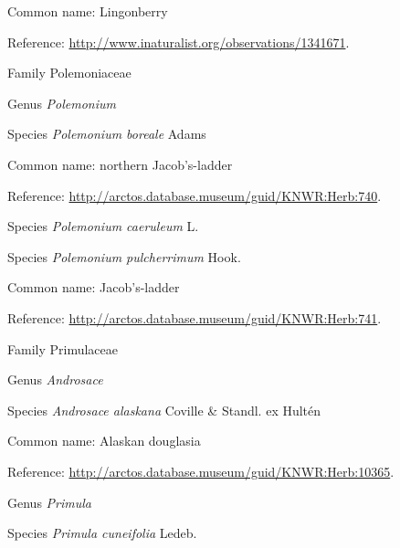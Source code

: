\documentclass[9pt, article]{memoir}
\begin{document}
\begin{multicols}{2}
Common name: Lingonberry

Reference: 
\url{http://www.inaturalist.org/observations/1341671}.

\vspace{6pt}\noindent\hspace{24pt}Family Polemoniaceae


\vspace{6pt}\noindent\hspace{30pt}Genus \textit{Polemonium}


\vspace{6pt}\noindent\hspace{36pt}Species \textit{Polemonium boreale} Adams


Common name: northern Jacob's-ladder

Reference: 
\url{http://arctos.database.museum/guid/KNWR:Herb:740}.

\vspace{6pt}\noindent\hspace{36pt}Species \textit{Polemonium caeruleum} L.


\vspace{6pt}\noindent\hspace{36pt}Species \textit{Polemonium pulcherrimum} Hook.


Common name: Jacob's-ladder

Reference: 
\url{http://arctos.database.museum/guid/KNWR:Herb:741}.

\vspace{6pt}\noindent\hspace{24pt}Family Primulaceae


\vspace{6pt}\noindent\hspace{30pt}Genus \textit{Androsace}


\vspace{6pt}\noindent\hspace{36pt}Species \textit{Androsace alaskana} Coville \& Standl. ex Hultén


Common name: Alaskan douglasia

Reference: 
\url{http://arctos.database.museum/guid/KNWR:Herb:10365}.

\vspace{6pt}\noindent\hspace{30pt}Genus \textit{Primula}


\vspace{6pt}\noindent\hspace{36pt}Species \textit{Primula cuneifolia} Ledeb.



\end{multicols}
\end{document}

